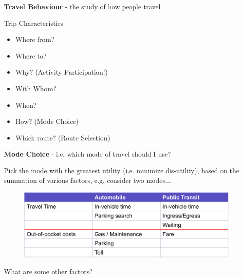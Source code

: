 \documentclass[aspectratio=169]{beamer}
\begin{document}
\begin{frame}
	
	\textbf{Travel Behaviour} - the study of how people travel
	
	\vspace{4mm}
	
	Trip Characteristics
	
	\begin{itemize}
		\item Where from?
		\item Where to?
		\item Why? (Activity Participation!)
		\item With Whom?
		\item When?
		\item How? (Mode Choice)
		\item Which route? (Route Selection)
	\end{itemize}
	
	
\end{frame}




\begin{frame}
	
	\textbf{Mode Choice} - i.e. which mode of travel should I use?
	\vspace{4mm}
	
	Pick the mode with the greatest utility (i.e. minimize dis-utility), based on the summation of various factors, e.g. consider two modes... 
	\vspace{2mm}
	
	\begin{figure}
		\centering
		\includegraphics[width=0.9\linewidth]{images/simple_mode_choice.png}
	\end{figure}

	What are some other factors?
	
	
\end{frame}
\end{document}
